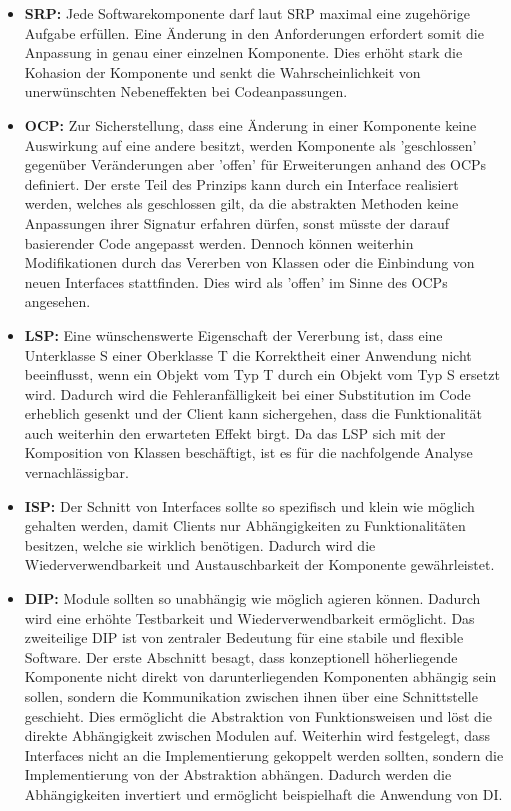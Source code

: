 \begin{itemize}[]
	\item \textbf{\acrlong{SRP}: } {Jede Softwarekomponente darf laut SRP maximal eine zugehörige Aufgabe erfüllen. Eine Änderung in den Anforderungen erfordert somit die Anpassung in genau einer einzelnen Komponente. Dies erhöht stark die \Gls{Kohasion} der Komponente und senkt die Wahrscheinlichkeit von unerwünschten Nebeneffekten bei Codeanpassungen.}
	\item \textbf{\acrlong{OCP}: } {Zur Sicherstellung, dass eine Änderung in einer Komponente keine Auswirkung auf eine andere besitzt, werden Komponente als 'geschlossen' gegenüber Veränderungen aber 'offen' für Erweiterungen anhand des OCPs definiert. Der erste Teil des Prinzips kann durch ein Interface realisiert werden, welches als geschlossen gilt, da die abstrakten Methoden keine Anpassungen ihrer Signatur erfahren dürfen, sonst müsste der darauf basierender Code angepasst werden. Dennoch können weiterhin Modifikationen durch das Vererben von Klassen oder die Einbindung von neuen Interfaces stattfinden. Dies wird als 'offen' im Sinne des OCPs angesehen.}
	\item \textbf{\acrlong{LSP}: } {Eine wünschenswerte Eigenschaft der Vererbung ist, dass eine Unterklasse S einer Oberklasse T die Korrektheit einer Anwendung nicht beeinflusst, wenn ein Objekt vom Typ T durch ein Objekt vom Typ S ersetzt wird. Dadurch wird die Fehleranfälligkeit bei einer Substitution im Code erheblich gesenkt und der Client kann sichergehen, dass die Funktionalität auch weiterhin den erwarteten Effekt birgt. Da das LSP sich mit der Komposition von Klassen beschäftigt, ist es für die nachfolgende Analyse vernachlässigbar.}
	\item \textbf{\acrlong{ISP}: } {Der Schnitt von Interfaces sollte so spezifisch und klein wie möglich gehalten werden, damit Clients nur Abhängigkeiten zu Funktionalitäten besitzen, welche sie wirklich benötigen. Dadurch wird die Wiederverwendbarkeit und Austauschbarkeit der Komponente gewährleistet.}
	\item \textbf{\acrlong{DIP}: } {Module sollten so unabhängig wie möglich agieren können. Dadurch wird eine erhöhte Testbarkeit und Wiederverwendbarkeit ermöglicht. Das zweiteilige DIP ist von zentraler Bedeutung für eine stabile und flexible Software. Der erste Abschnitt besagt, dass konzeptionell höherliegende Komponente nicht direkt von darunterliegenden Komponenten abhängig sein sollen, sondern die Kommunikation zwischen ihnen über eine Schnittstelle geschieht. Dies ermöglicht die Abstraktion von Funktionsweisen und löst die direkte Abhängigkeit zwischen Modulen auf. Weiterhin wird festgelegt, dass Interfaces nicht an die Implementierung gekoppelt werden sollten, sondern die Implementierung von der Abstraktion abhängen. Dadurch werden die Abhängigkeiten invertiert und ermöglicht beispielhaft die Anwendung von \Gls{DI}.}
\end{itemize}

